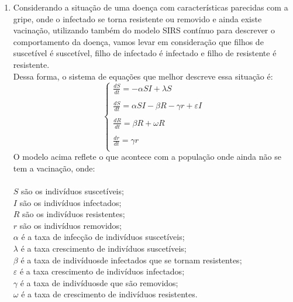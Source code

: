 \documentclass[a4paper]{article}
\begin{document}
\begin{enumerate}
\item
Considerando a situa\c{c}\~ao de uma doen\c{c}a com caracter\'isticas parecidas com a gripe, onde o infectado se torna resistente ou removido e ainda existe vacina\c{c}\~ao, utilizando tamb\'em do modelo SIRS cont\'inuo para descrever o comportamento da doen\c{c}a, vamos levar em considera\c{c}\~ao que filhos de suscet\'ivel \'e suscet\'ivel, filho de infectado \'e infectado e filho de resistente \'e resistente. 
\\
Dessa forma, o sistema de equa\c{c}\~oes que melhor descreve essa situa\c{c}\~ao \'e:
\\
\begin{equation}
\left\{\begin{array}{l}
\frac{dS}{dt} = -\alpha SI + \lambda S\\
\\
\frac{dS}{dt} = \alpha SI - \beta R - \gamma r + \varepsilon I\\
\\
\frac{dR}{dt} = \beta R + \omega R \\
\\
\frac{dr}{dt} = \gamma r \\
\end{array}
\end{equation}
O modelo acima reflete o que acontece com a popula\c{c}\~ao onde ainda n\~ao se tem a vacina\c{c}\~ao, onde:
\\
\\
$S$ s\~ao os indiv\'iduos suscet\'iveis;
\\
$I$ s\~ao os indiv\'iduos infectados;
\\
$R$ s\~ao os indiv\'iduos resistentes;
\\
$r$ s\~ao os indiv\'iduos removidos;
\\
$\alpha$ \'e a taxa de infec\c{c}\~ao de indiv\'iduos suscet\'iveis;
\\
$\lambda$ \'e a taxa crescimento de indiv\'iduos suscet\'iveis;
\\
$\beta$ \'e a taxa  de indiv\'iduosde infectados que se tornam resistentes;
\\
$\varepsilon$ \'e a taxa crescimento de indiv\'iduos infectados;
\\
$\gamma$ \'e a taxa  de indiv\'iduosde que s\~ao removidos;
\\
$\omega$ \'e a taxa de crescimento de indiv\'iduos resistentes.
\\
\\

\end{enumerate}
\end{document}
